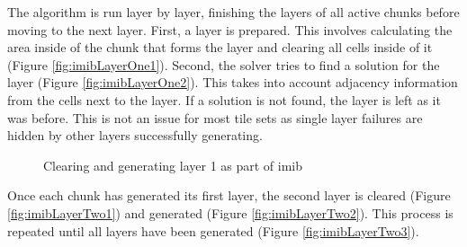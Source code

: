 The algorithm is run layer by layer, finishing the layers of all active chunks before moving to the next layer. First, a layer is prepared. This involves calculating the area inside of the chunk that forms the layer and clearing all cells inside of it (Figure \ref{fig:imibLayerOne1}). Second, the solver tries to find a solution for the layer (Figure \ref{fig:imibLayerOne2}). This takes into account adjacency information from the cells next to the layer. If a solution is not found, the layer is left as it was before. This is not an issue for most tile sets as single layer failures are hidden by other layers successfully generating.

\begin{figure}[H]
    \centering
    \hfill
    \caption{Clearing and generating layer 1 as part of \acrshort{imib}}
    \label{fig:imibLayerOne}
\end{figure}

Once each chunk has generated its first layer, the second layer is cleared (Figure \ref{fig:imibLayerTwo1}) and generated (Figure \ref{fig:imibLayerTwo2}). This process is repeated until all layers have been generated (Figure \ref{fig:imibLayerTwo3}).

